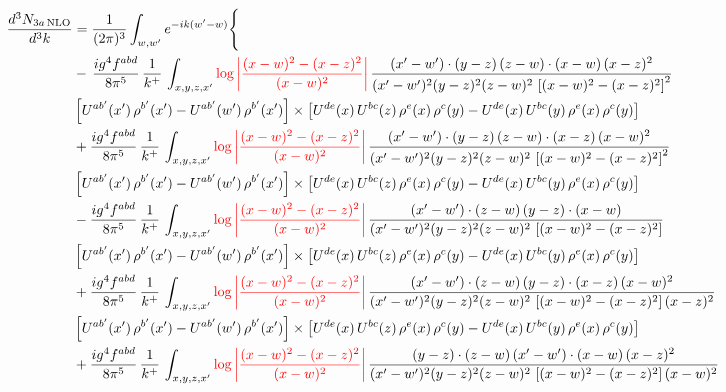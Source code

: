 \documentclass[9pt]{article}
\numberwithin{equation}{section}
\begin{document}
\begin{align}
\frac{d^{3}N_{3a\,\rm NLO}}{d^{3}k} & = \frac{1}{(2\pi)^{3}}\int_{w,w'}e^{-ik(w'-w)}\Bigg\{\notag \\
& -\,\frac{ig^{4}f^{abd}}{8\pi^{5}}\,\frac{1}{k^{+}}\,\int_{x,y,z,x'}{\color{red}\log{\left|\frac{(x-w)^{2}-(x-z)^{2}}{(x-w)^{2}}\right|}}\,
\frac{(x'-w')\cdot(y-z)\,(z-w)\cdot(x-w)\,(x-z)^{2}}{(x'-w')^{2}(y-z)^{2}(z-w)^{2}\,\left[(x-w)^{2}-(x-z)^{2}\right]^{2}}\notag \\ & \left[U^{ab'}(x')\,\rho^{b'}(x')-U^{ab'}(w')\, \rho^{b'}(x')\right]\times \left[U^{de}(x)\,U^{bc}(z)\, \rho^{e}(x)\,\rho^{c}(y)-U^{de}(x)\,U^{bc}(y)\,\rho^{e}(x)\,\rho^{c}(y)\right] \notag \\
& +\frac{ig^{4}f^{abd}}{8\pi^{5}}\,\frac{1}{k^{+}}\,\int_{x,y,z,x'}{\color{red}\log{\left|\frac{(x-w)^{2}-(x-z)^{2}}{(x-w)^{2}}\right|}}\,
\frac{(x'-w')\cdot(y-z)\,(z-w)\cdot(x-z)\,(x-w)^{2}}{(x'-w')^{2}(y-z)^{2}(z-w)^{2}\,\left[(x-w)^{2}-(x-z)^{2}\right]^{2}}\notag \\ 
&\left[U^{ab'}(x')\,\rho^{b'}(x')-U^{ab'}(w')\, \rho^{b'}(x')\right]\times \left[U^{de}(x)\,U^{bc}(z)\, \rho^{e}(x)\,\rho^{c}(y)-U^{de}(x)\,U^{bc}(y)\,\rho^{e}(x)\,\rho^{c}(y)\right] \notag \\
& -\frac{ig^{4}f^{abd}}{8\pi^{5}}\,\frac{1}{k^{+}}\,\int_{x,y,z,x'}{\color{red}\log{\left|\frac{(x-w)^{2}-(x-z)^{2}}{(x-w)^{2}}\right|}}\,
\frac{(x'-w')\cdot(z-w)\,(y-z)\cdot(x-w)}{(x'-w')^{2}(y-z)^{2}(z-w)^{2}\,\left[(x-w)^{2}-(x-z)^{2}\right]}\notag \\ & \left[U^{ab'}(x')\,\rho^{b'}(x')-U^{ab'}(w')\, \rho^{b'}(x')\right]\times \left[U^{de}(x)\,U^{bc}(z)\, \rho^{e}(x)\,\rho^{c}(y)-U^{de}(x)\,U^{bc}(y)\,\rho^{e}(x)\,\rho^{c}(y)\right] \notag \\
&  +\frac{ig^{4}f^{abd}}{8\pi^{5}}\,\frac{1}{k^{+}}\,\int_{x,y,z,x'}{\color{red}\log{\left|\frac{(x-w)^{2}-(x-z)^{2}}{(x-w)^{2}}\right|}}\,
\frac{(x'-w')\cdot(z-w)\,(y-z)\cdot(x-z)\,(x-w)^{2}}{(x'-w')^{2}(y-z)^{2}(z-w)^{2}\,\left[(x-w)^{2}-(x-z)^{2}\right](x-z)^{2}}\notag \\ & \left[U^{ab'}(x')\,\rho^{b'}(x')-U^{ab'}(w')\, \rho^{b'}(x')\right]\times \left[U^{de}(x)\,U^{bc}(z)\, \rho^{e}(x)\,\rho^{c}(y)-U^{de}(x)\,U^{bc}(y)\,\rho^{e}(x)\,\rho^{c}(y)\right] \notag \\
& +\frac{ig^{4}f^{abd}}{8\pi^{5}}\,\frac{1}{k^{+}}\,\int_{x,y,z,x'}{\color{red}\log{\left|\frac{(x-w)^{2}-(x-z)^{2}}{(x-w)^{2}}\right|}}\,
\frac{(y-z)\cdot(z-w)\,(x'-w')\cdot(x-w)\,(x-z)^{2}}{(x'-w')^{2}(y-z)^{2}(z-w)^{2}\,\left[(x-w)^{2}-(x-z)^{2}\right](x-w)^{2}}\notag \\ 

\end{align}
\end{document}
